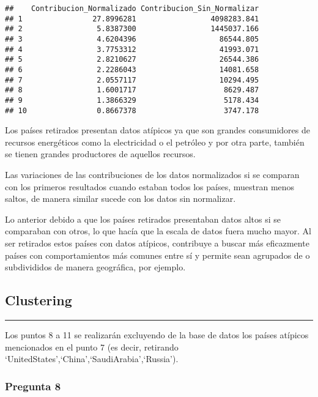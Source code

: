 \documentclass[
]{article}
\begin{document}
\begin{verbatim}
##    Contribucion_Normalizado Contribucion_Sin_Normalizar
## 1                27.8996281                 4098283.841
## 2                 5.8387300                 1445037.166
## 3                 4.6204396                   86544.805
## 4                 3.7753312                   41993.071
## 5                 2.8210627                   26544.386
## 6                 2.2286043                   14081.658
## 7                 2.0557117                   10294.495
## 8                 1.6001717                    8629.487
## 9                 1.3866329                    5178.434
## 10                0.8667378                    3747.178
\end{verbatim}

Los países retirados presentan datos atípicos ya que son grandes
consumidores de recursos energéticos como la electricidad o el petróleo
y por otra parte, también se tienen grandes productores de aquellos
recursos.

Las variaciones de las contribuciones de los datos normalizados si se
comparan con los primeros resultados cuando estaban todos los países,
muestran menos saltos, de manera similar sucede con los datos sin
normalizar.

Lo anterior debido a que los países retirados presentaban datos altos si
se comparaban con otros, lo que hacía que la escala de datos fuera mucho
mayor. Al ser retirados estos países con datos atípicos, contribuye a
buscar más eficazmente países con comportamientos más comunes entre sí y
permite sean agrupados de o subdivididos de manera geográfica, por
ejemplo.

\subsection{Clustering}\label{clustering}

\begin{center}\rule{0.5\linewidth}{0.5pt}\end{center}

Los puntos 8 a 11 se realizarán excluyendo de la base de datos los
países atípicos mencionados en el punto 7 (es decir, retirando
`UnitedStates',`China',`SaudiArabia',`Russia').

\subsubsection{Pregunta 8}\label{pregunta-8}
\end{document}

